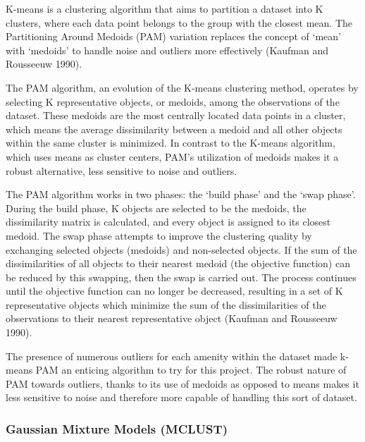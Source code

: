 \documentclass[11pt, a4paper]{article}
\begin{document}
K-means is a clustering algorithm that aims to partition a dataset into K clusters, where each data point belongs to the group with the closest mean. The Partitioning Around Medoids (PAM) variation replaces the concept of `mean' with `medoids' to handle noise and outliers more effectively  (Kaufman and Rousseeuw 1990).
\par
The PAM algorithm, an evolution of the K-means clustering method, operates by selecting K representative objects, or medoids, among the observations of the dataset. These medoids are the most centrally located data points in a cluster, which means the average dissimilarity between a medoid and all other objects within the same cluster is minimized. In contrast to the K-means algorithm, which uses means as cluster centers, PAM's utilization of medoids makes it a robust alternative, less sensitive to noise and outliers.
\par
The PAM algorithm works in two phases: the `build phase' and the `swap phase'. During the build phase, K objects are selected to be the medoids, the dissimilarity matrix is calculated, and every object is assigned to its closest medoid. The swap phase attempts to improve the clustering quality by exchanging selected objects (medoids) and non-selected objects. If the sum of the dissimilarities of all objects to their nearest medoid (the objective function) can be reduced by this swapping, then the swap is carried out. The process continues until the objective function can no longer be decreased, resulting in a set of K representative objects which minimize the sum of the dissimilarities of the observations to their nearest representative object (Kaufman and Rousseeuw 1990).
\par
The presence of numerous outliers for each amenity within the dataset made k-means PAM an enticing algorithm to try for this project. The robust nature of PAM towards outliers, thanks to its use of medoids as opposed to means makes it less sensitive to noise and therefore more capable of handling this sort of dataset.





\subsubsection{Gaussian Mixture Models (MCLUST)}
\end{document}
